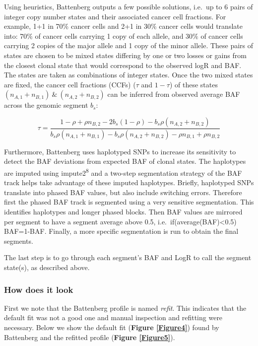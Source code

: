 \documentclass[]{article}
\begin{document}
Using heuristics, Battenberg outputs a few possible solutions, i.e.~up
to 6 pairs of integer copy number states and their associated cancer
cell fractions. For example, 1+1 in 70\% cancer cells and 2+1 in 30\%
cancer cells would translate into: 70\% of cancer cells carrying 1 copy
of each allele, and 30\% of cancer cells carrying 2 copies of the major
allele and 1 copy of the minor allele. These pairs of states are chosen
to be mixed states differing by one or two losses or gains from the
closest clonal state that would correspond to the observed logR and BAF.
The states are taken as combinations of integer states. Once the two
mixed states are fixed, the cancer cell fractions (CCFs) (\(\tau\) and
\(1-\tau\)) of these states
\((n_{A,1}+n_{B,1}) \ \& \ (n_{A,2}+n_{B,2})\) can be inferred from
observed average BAF across the genomic segment \(b_s\):

\[ \tau=\frac{1-\rho+\rho
  n_{B,2}-2b_s(1-\rho)-b_s\rho(n_{A,2}+n_{B,2})}{b_s\rho(n_{A,1}+n_{B,1})-b_s\rho(n_{A,2}+n_{B,2})-\rho
  n_{B,1}+\rho n_{B,2}}\]

Furthermore, Battenberg uses haplotyped SNPs to increase its sensitivity
to detect the BAF deviations from expected BAF of clonal states. The
haplotypes are imputed using impute2\textsuperscript{8} and a two-step
segmentation strategy of the BAF track helps take advantage of these
imputed haplotypes. Briefly, haplotyped SNPs translate into phased BAF
values, but also include switching errors. Therefore first the phased
BAF track is segmented using a very sensitive segmentation. This
identifies haplotypes and longer phased blocks. Then BAF values are
mirrored per segment to have a segment average above 0.5,
i.e.~if(average(BAF)\textless{}0.5) BAF=1-BAF. Finally, a more specific
segmentation is run to obtain the final segments.

The last step is to go through each segment's BAF and LogR to call the
segment state(s), as described above.

\hypertarget{how-does-it-look}{%
\subsubsection{How does it look}\label{how-does-it-look}}

First we note that the Battenberg profile is named \emph{refit}. This
indicates that the default fit was not a good one and manual inspection
and refitting were necessary. Below we show the default fit
(\textbf{Figure \ref{Figure4}}) found by Battenberg and the refitted
profile (\textbf{Figure \ref{Figure5}}).
\end{document}
